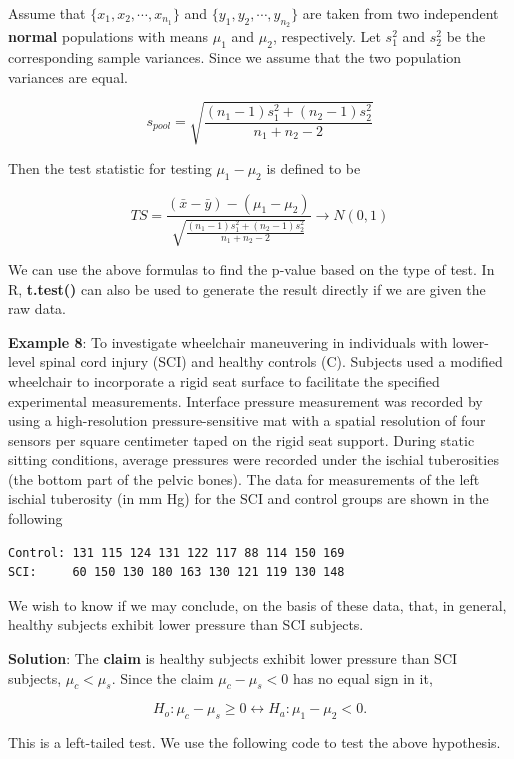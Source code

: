 \documentclass[
]{book}
\begin{document}
Assume that \(\{ x_1, x_2, \cdots, x_{n_1}\}\) and \(\{ y_1, y_2, \cdots, y_{n_2}\}\) are taken from two independent \textbf{normal} populations with means \(\mu_1\) and \(\mu_2\), respectively. Let \(s_1^2\) and \(s_2^2\) be the corresponding sample variances. Since we assume that the two population variances are equal.

\[
s_{pool} = \sqrt{\frac{(n_1-1)s_1^2 + (n_2-1)s_2^2}{n_1 + n_2 -2}}
\]

Then the test statistic for testing \(\mu_1 - \mu_2\) is defined to be

\[
TS = \frac{(\bar{x}-\bar{y}) -(\mu_1-\mu_2)}{\sqrt{\frac{(n_1-1)s_1^2 + (n_2-1)s_2^2}{n_1 + n_2 -2}}} \to N(0, 1)
\]

We can use the above formulas to find the p-value based on the type of test. In R, \textbf{t.test()} can also be used to generate the result directly if we are given the raw data.

\textbf{Example 8}: To investigate wheelchair maneuvering in individuals with lower-level spinal cord injury (SCI) and healthy controls (C). Subjects used a modified wheelchair to incorporate a rigid seat surface to facilitate the specified experimental measurements. Interface pressure measurement was recorded by using a high-resolution pressure-sensitive mat with a spatial resolution of four sensors per square centimeter taped on the rigid seat support. During static sitting conditions, average pressures were recorded under the ischial tuberosities (the bottom part of the pelvic bones). The data for measurements of the left ischial tuberosity (in mm Hg) for the SCI and control groups are shown in the following

\begin{verbatim}
Control: 131 115 124 131 122 117 88 114 150 169
SCI:     60 150 130 180 163 130 121 119 130 148
\end{verbatim}

We wish to know if we may conclude, on the basis of these data, that, in general, healthy subjects exhibit lower pressure than SCI subjects.

\textbf{Solution}: The \textbf{claim} is healthy subjects exhibit lower pressure than SCI subjects, \(\mu_c < \mu_s\). Since the claim \(\mu_c - \mu_s < 0\) has no equal sign in it,

\[
H_o: \mu_c - \mu_s \ge 0 \leftrightarrow  H_a: \mu_1 - \mu_2 < 0 .
\]

This is a left-tailed test. We use the following code to test the above hypothesis.
\end{document}
